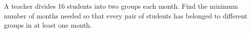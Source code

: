 A teacher divides 16 students into two groups each month. Find the minimum number of months needed so that every pair of students has belonged to different groups in at least one month.
